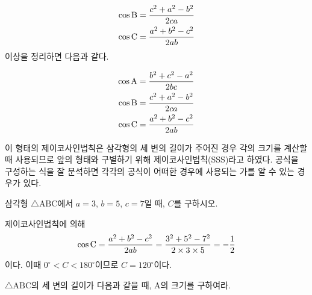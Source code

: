 \documentclass[11pt, a4paper]{book}
\begin{document}
  \begin{align*}
  \cos \textrm{B} &= \frac{c^2+a^2-b^2}{2ca} \\
  \cos \textrm{C} &=\frac{a^2+b^2-c^2}{2ab}
  \end{align*}
이상을 정리하면 다음과 같다.

\begin{theorem}
	\begin{align*}
		\cos \textrm{A} &=\frac{b^2+c^2-a^2}{2bc} \\
		 \cos \textrm{B} &= \frac{c^2+a^2-b^2}{2ca} \\
		\cos \textrm{C} &=\frac{a^2+b^2-c^2}{2ab}
	\end{align*}
\end{theorem}
 이 형태의 제이코사인법칙은 삼각형의 세 변의 길이가 주어진 경우 각의 크기를 계산할 때 사용되므로 앞의 형태와 구별하기 위해 제이코사인법칙(SSS)라고 하였다.  공식을 구성하는 식을 잘 분석하면 각각의 공식이 어떠한 경우에 사용되는 가를 알 수 있는 경우가 있다.
 \begin{example}
 	삼각형 $\triangle \text{ABC}$에서 $a=3$, $b=5$, $c=7$일 때, $C$를 구하시오.
 	\begin{solution}
 		제이코사인법칙에 의해
 		\[
 		\cos \textrm{C} =\frac{a^2+b^2-c^2}{2ab} = \frac{3^2+5^2-7^2}{2\times 3 \times 5} = -\frac{1}{2}
 		\]
 		이다. 이때 $0^{\circ}<C<180^{\circ}$이므로 $C =120^{\circ}$이다.
 	\end{solution}
 \end{example}

\begin{problem}
	$\triangle \textrm{ABC}$의 세 변의 길이가 다음과 같을 때, \textrm{A}의 크기를 구하여라.
\end{problem}
\vspace{1em}
\end{document}
